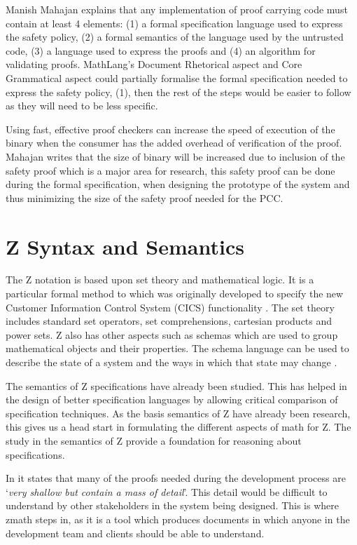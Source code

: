 Manish Mahajan \cite{pccman} explains that any implementation of proof carrying code must contain at least 4 elements: (1) a formal specification language used to express the safety policy, (2) a formal semantics of the language used by the untrusted code, (3) a language used to express the proofs and (4) an algorithm for validating proofs. MathLang's Document Rhetorical aspect and Core Grammatical aspect could partially formalise the formal specification needed to express the safety policy, (1), then the rest of the steps would be easier to follow as they will need to be less specific.

Using fast, effective proof checkers can increase the speed of execution of the binary when the consumer has the added overhead of verification of the proof. Mahajan writes that the size of binary will be increased due to inclusion of the safety proof which is a major area for research, this safety proof can be done during the formal specification, when designing the prototype of the system and thus minimizing the size of the safety proof needed for the PCC.

\section{Z Syntax and Semantics}

The Z notation is based upon set theory and mathematical logic. It is a particular formal method to which was originally developed to specify the new Customer Information Control System (CICS) functionality \cite{cics}. The set theory includes standard set operators, set comprehensions, cartesian products and power sets. Z also has other aspects such as schemas which are used to group mathematical objects and their properties. The schema language can be used to describe the state of a system and the ways in which that state may change \cite{Woodcock:1996:UZS:235337}.

The semantics of Z specifications have already been studied. This has helped in the design of better specification languages by allowing critical comparison of specification techniques. As the basis semantics of Z have already been research, this gives us a head start in formulating the different aspects of \gls{math} for Z. The study in the semantics of Z provide a foundation for reasoning about specifications.

In \cite{formsem} it states that many of the proofs needed during the development process are `\textit{very shallow but contain a mass of detail}'. This detail would be difficult to understand by other stakeholders in the system being designed. This is where \gls{zmath} steps in, as it is a tool which produces documents in which anyone in the development team and clients should be able to understand.

